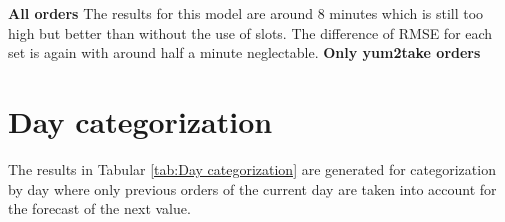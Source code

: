 \newline\newline\textbf{All orders}\newline
The results for this model are around 8 minutes which is still too high but better than without the use of slots. The difference of RMSE for each set is again with around half a minute neglectable.
\newline\newline\textbf{Only yum2take orders}\newline
\section{Day categorization}\label{section:Day categorization}
The results in Tabular \ref{tab:Day categorization} are generated for categorization by day where only previous orders of the current day are taken into account for the forecast of the next value.
\begin{table}[h]
\centering
\caption{Day categorization results}
\label{tab:Day categorization}
\end{table}

